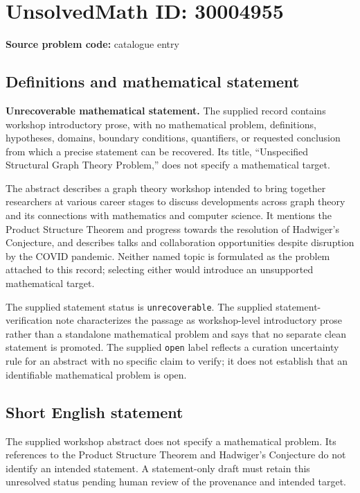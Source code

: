 \documentclass[11pt]{article}
\begin{document}
\section*{UnsolvedMath ID: 30004955}
\textbf{Source problem code:} catalogue entry
\subsection{Definitions and mathematical statement}
\textbf{Unrecoverable mathematical statement.} The supplied record contains workshop introductory prose, with no mathematical problem, definitions, hypotheses, domains, boundary conditions, quantifiers, or requested conclusion from which a precise statement can be recovered. Its title, ``Unspecified Structural Graph Theory Problem,'' does not specify a mathematical target.

The abstract describes a graph theory workshop intended to bring together researchers at various career stages to discuss developments across graph theory and its connections with mathematics and computer science. It mentions the Product Structure Theorem and progress towards the resolution of Hadwiger's Conjecture, and describes talks and collaboration opportunities despite disruption by the COVID pandemic. Neither named topic is formulated as the problem attached to this record; selecting either would introduce an unsupported mathematical target.

The supplied statement status is \texttt{unrecoverable}. The supplied statement-verification note characterizes the passage as workshop-level introductory prose rather than a standalone mathematical problem and says that no separate clean statement is promoted. The supplied \texttt{open} label reflects a curation uncertainty rule for an abstract with no specific claim to verify; it does not establish that an identifiable mathematical problem is open.
\subsection{Short English statement}
The supplied workshop abstract does not specify a mathematical problem. Its references to the Product Structure Theorem and Hadwiger's Conjecture do not identify an intended statement. A statement-only draft must retain this unresolved status pending human review of the provenance and intended target.
\end{document}
